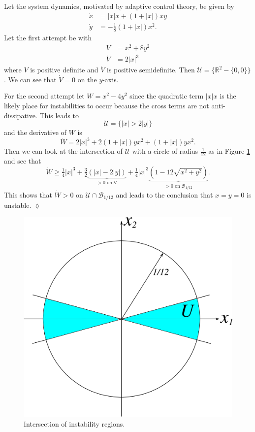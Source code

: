 \begin{example}
Let the system dynamics, motivated by adaptive control theory, be given by
\begin{align*}
\dot{x} &= |x|x + (1+|x|)xy \\
\dot{y} &= -\tfrac{1}{8}(1+|x|)x^2.
\end{align*}
Let the first attempt be with
\begin{align*}
V &= x^2 + 8y^2 \\
\dot{V} &= 2|x|^3
\end{align*}
where $V$ is positive definite and $\dot{V}$ is positive semidefinite. Then $\mathcal{U} = \{\mathbb{R}^2 - \{0,0\}\}$. We can see that $\dot{V} = 0$ on the $y$-axis.

For the second attempt let $W=x^2-4y^2$ since the quadratic term $|x|x$ is the likely place for instabilities to occur because the cross terms are not anti-dissipative. This leads to
$$\mathcal{U} = \{|x|>2|y|\}$$
and the derivative of $W$ is
$$\dot{W} = 2|x|^3 + 2(1+|x|)yx^2 + (1+|x|)yx^2.$$
Then we can look at the intersection of $\mathcal{U}$ with a circle of radius $\tfrac{1}{12}$ as in Figure \ref{fig:10unstableW} and see that
$$\dot{W} \geq \tfrac{1}{4}|x|^3 + \tfrac{3}{2}\underbrace{(|x|-2|y|)}_{>0\text{ on }\mathcal{U}} + \tfrac{1}{4}|x|^3 \underbrace{(1-12\sqrt{x^2+y^2})}_{>0\text{ on }\mathcal{B}_{1/12}}.$$
This shows that $\dot{W}>0$ on $\mathcal{U}\cap\mathcal{B}_{1/12}$ and leads to the conclusion that $x=y=0$ is unstable.
$\lozenge$
\end{example}

\begin{figure}[ht!]
	\centering
	\includegraphics[width=.4\textwidth]{images/10unstableW}
	\caption{Intersection of instability regions.}
	\label{fig:10unstableW}
\end{figure}


